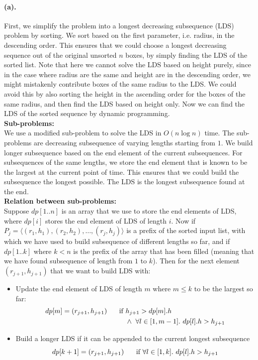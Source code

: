 \documentclass[12pt]{article}
\begin{document}
\paragraph{(a).}
First, we simplify the problem into a longest decreasing subsequence (LDS) problem by sorting. We sort based on the first parameter, i.e. radius, in the descending order. This ensures that we could choose a longest decreasing sequence out of the original unsorted \(n\) boxes, by simply finding the LDS of the sorted list. Note that here we cannot solve the LDS based on height purely, since in the case where radius are the same and height are in the descending order, we might mistakenly contribute boxes of the same radius to the LDS. We could avoid this by also sorting the height in the ascending order for the boxes of the same radius, and then find the LDS based on height only.
Now we can find the LDS of the sorted sequence by dynamic programming. \\
\textbf{Sub-problems:}\\
We use a modified sub-problem \cite{OMS}  to solve the LDS in \(O(n\log n)\) time. The sub-problems are decreasing subsequence of varying lengths starting from \(1\). We build longer subsequence based on the end element of the current subsequences. For subsequences of the same lengths, we store the end element that is known to be the largest at the current point of time. This ensures that we could build the subsequence the longest possible. The LDS is the longest subsequence found at the end.\\
\textbf{Relation between sub-problems:} \\
Suppose \(dp[1..n]\) is an array that we use to store the end elements of LDS, where \(dp[i]\) stores the end element of LDS of length \(i\). Now if \(P_j = \langle(r_1,h_1), (r_2, h_2), \hdots, (r_j, h_j)\rangle\) is a prefix of the sorted input list, with which we have used to build subsequence of different lengths so far, and if \(dp[1..k]\) where \(k < n\) is the prefix of the array that has been filled (meaning that we have found subsequence of length from \(1\) to \(k\)). Then for the next element \((r_{j+1}, h_{j+1})\) that we want to build LDS with:
\begin{itemize}
     \setlength \itemsep{0em} 
     \item Update the end element of LDS of length \(m\) where \(m \leq k\) to be the largest so far:
     \begin{align*}
          dp[m] = (r_{j+1}, h_{j+1}) \hspace{0.5cm} 
          \text{ if } &h_{j+1} > dp[m].h\\ 
          &\land\ \forall l\in [1,m-1].\ dp[l].h > h_{j+1}
     \end{align*}
     \item Build a longer LDS if it can be appended to the current longest subsequence
     \begin{equation*}
          dp[k+1] = (r_{j+1}, h_{j+1}) \hspace{0.5cm} \text{ if } \forall l\in[1,k].\ dp[l].h > h_{j+1}
     \end{equation*}
\end{itemize}
 
\end{document}
